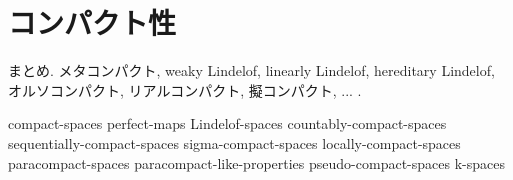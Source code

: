 \documentclass[uplatex, dvipdfmx, a4paper, 12pt, class=jsbook, crop=false]{standalone}
\begin{document}
\chapter{コンパクト性}
\label{chap:compactness}

まとめ.
メタコンパクト, weaky Lindelof, linearly Lindelof, hereditary Lindelof, オルソコンパクト, リアルコンパクト, 擬コンパクト, ... \WIP.

{compact-spaces}
{perfect-maps}
{Lindelof-spaces}
{countably-compact-spaces}
{sequentially-compact-spaces}
{sigma-compact-spaces}
{locally-compact-spaces}
{paracompact-spaces}
{paracompact-like-properties}
{pseudo-compact-spaces}
{k-spaces}
\end{document}
